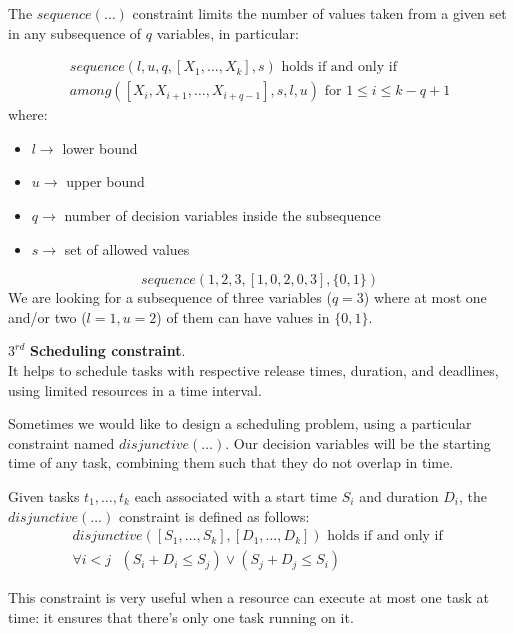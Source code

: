 The $\textit{sequence}(\dots)$ constraint limits the number of values taken from a given set in any subsequence of $q$ variables, in particular:
\begin{definition}[title = $\textit{sequence}(\dots)$]
    $$
        \begin{gathered}
            \textit{sequence}(l, u, q, [X_1, \dots, X_k], s) \text{ holds if and only if } \\
            \textit{among}([X_i, X_{i+1}, \dots, X_{i+q-1}], s, l, u) \text{ for } 1 \leq i \leq k - q + 1
        \end{gathered}
    $$
    where:
    \begin{itemize}
        \renewcommand{\labelitemi}{-}
        \item $l \rightarrow$ lower bound
        \item $u \rightarrow$ upper bound
        \item $q \rightarrow$ number of decision variables inside the subsequence
        \item $s \rightarrow$ set of allowed values
    \end{itemize}
\end{definition}
\begin{example}
    $$ \textit{sequence}(1, 2, 3, [1, 0, 2, 0, 3], \{0,1\}) $$
    We are looking for a subsequence of three variables ($q = 3$) where at most one and/or two ($l = 1, u = 2$) of them can have values in $\{0, 1\}$.
\end{example}
$3^{rd}$ \textbf{Scheduling constraint}. \\ 
It helps to schedule tasks with respective release times, duration, and deadlines, using limited resources in a time interval. \vspace{7pt}

Sometimes we would like to design a scheduling problem, using a particular constraint named $\textit{disjunctive}(\dots)$. Our decision variables
will be the starting time of any task, combining them such that they do not overlap in time. 
\begin{definition}[title = $\textit{disjunctive}(\dots)$]
    Given tasks $t_1, \dots, t_k$ each associated with a start time $S_i$ and duration $D_i$, the $\textit{disjunctive}(\dots)$ constraint is defined as follows:
    $$
        \begin{gathered}
            \textit{disjunctive}([S_1, \dots, S_k], [D_1, \dots, D_k]) \text{ holds if and only if } \\
            \forall i < j \text{ } (S_i + D_i \leq S_j) \vee (S_j + D_j \leq S_i)
        \end{gathered}
    $$
\end{definition}
This constraint is very useful when a resource can execute at most one task at time: it ensures that there's only one task running on it. \vspace{7pt}

